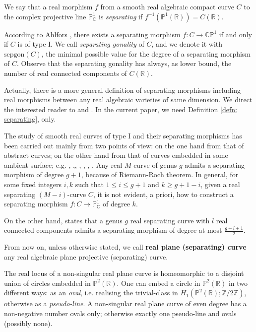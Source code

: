\begin{defn}
\label{defn: separating}
We say that a real morphism $f$ from a smooth real algebraic compact curve $C$ to the complex projective line $\mathbb P^1_{\mathbb C} $ is \textit{separating} if $f^{-1}(\mathbb P^1 (\mathbb R ) )= C (\mathbb R )$. 
\end{defn}
According to Ahlfors \cite[\S4.2]{Ahlf50}, there exists a separating morphism $f: C \rightarrow \mathbb C \mathbb P^1$ if and only if $C$ is of type I. We call \textit{separating gonality} of $C$, and we denote it with $\text{sepgon}(C)$, the minimal possible value for the degree of a separating morphism of $C$. Observe that the separating gonality has always, as lower bound, the number of real connected components of $C(\mathbb R)$.

Actually, there is a more general definition of separating morphisms including real morphisms between any real algebraic varieties of same dimension. We direct the interested reader to \cite{KumSha20} and \cite{KumLeTMan22}. In the current paper, we need Definition \ref{defn: separating}, only.

The study of smooth real curves of type I and their separating morphisms has been carried out mainly from two points of view: on the one hand from that of abstract curves; on the other hand from that of curves embedded in some ambient surface; e.g. \cite{Huis01}, \cite{Gaba06},\cite{CopHui13}, \cite{Copp13}, \cite{Copp14}, \cite{KumShaw20}, \cite{Orev21}. 
Any real $M$-curve of genus $g$ admits a separating morphism of degree $g+1$, because of Riemann-Roch theorem. In general, for some fixed integers $i,k$ such that $1 \leq i \leq g+1$ and $k \geq g+1-i$, given a real separating $(M-i)$-curve $C$,  it is not evident, a priori, how to construct a separating morphism $f: C \rightarrow \mathbb P^1_{\mathbb C}$ of degree $k$. 

On the other hand, \cite[Theorem 7.1]{Gaba06} states that a genus $g$ real separating curve with $l$ real connected components admits a separating morphism of degree at most $\frac{g+ l+1}{2}$. 

From now on, unless otherwise stated, we call \textbf{real plane (separating) curve} any real algebraic plane projective (separating) curve.


The real locus of a non-singular real plane curve is homeomorphic to a disjoint union of circles embedded in $\mathbb P^2 (\mathbb{R})$. One can embed a circle in $\mathbb P^2(\mathbb{R})$ in two different ways: as an \textit{oval}, i.e. realising the trivial-class in $H_1( \mathbb P^2 (\mathbb{R}); \mathbb{Z}/2\mathbb{Z})$, otherwise as a \textit{pseudo-line}. A non-singular real plane curve of even degree has a non-negative number ovals only; otherwise exactly one pseudo-line and ovals (possibly none).

